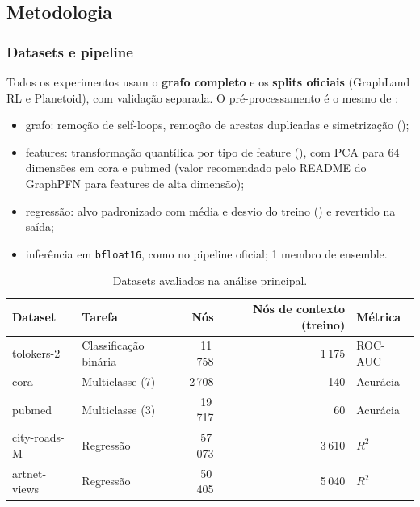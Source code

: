 \documentclass[12pt,a4paper]{article}
\begin{document}
\subsection{Metodologia}

\subsubsection{Datasets e pipeline}

Todos os experimentos usam o \textbf{grafo completo} e os \textbf{splits oficiais} (GraphLand RL e Planetoid), com validação separada. O pré-processamento é o mesmo de :
\begin{itemize}
  \item grafo: remoção de self-loops, remoção de arestas duplicadas e simetrização ();
  \item features: transformação quantílica por tipo de feature (), com PCA para 64 dimensões em cora e pubmed (valor recomendado pelo README do GraphPFN para features de alta dimensão);
  \item regressão: alvo padronizado com média e desvio do treino () e revertido na saída;
  \item inferência em \texttt{bfloat16}, como no pipeline oficial; 1 membro de ensemble.
\end{itemize}

\begin{table}[H]
\centering
\caption{Datasets avaliados na análise principal.}
\label{tab:gpfn-datasets}
\begin{tabular}{@{}llrrl@{}}
\toprule
Dataset & Tarefa & Nós & Nós de contexto (treino) & Métrica \\
\midrule
tolokers-2   & Classificação binária & 11\,758 & 1\,175 & ROC-AUC \\
cora         & Multiclasse (7)       & 2\,708  & 140    & Acurácia \\
pubmed       & Multiclasse (3)       & 19\,717 & 60     & Acurácia \\
city-roads-M & Regressão             & 57\,073 & 3\,610 & $R^2$ \\
artnet-views & Regressão             & 50\,405 & 5\,040 & $R^2$ \\
\bottomrule
\end{tabular}
\end{table}
\end{document}
